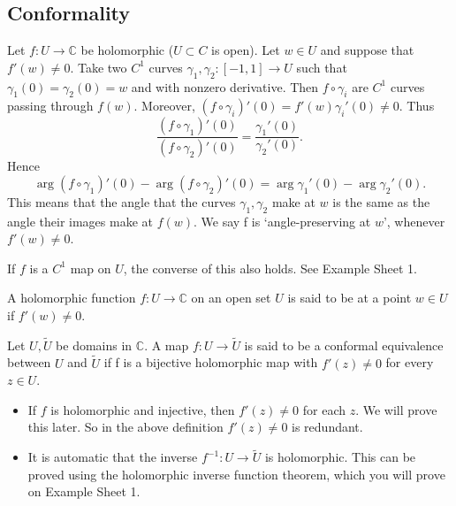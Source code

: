 \documentclass[a4paper]{scrartcl}
\begin{document}
\subsection{Conformality}
Let $f: U \rightarrow \mathbb{C}$ be holomorphic ($U \subset C $ is open). Let $w \in U$ and suppose that $f' (w) \neq 0$. Take two $C^{1}$ curves $\gamma_1 , \gamma_2 : [-1,1] \rightarrow U$ such that $\gamma_1 (0)=\gamma_2 (0)=w$ and with nonzero derivative. Then $f \circ \gamma_i$ are $C^{1}$ curves passing through $f (w)$. Moreover, $(f \circ \gamma_i)' (0)=f' (w)\gamma_{i}' (0)\neq 0$. Thus \[
\frac{(f \circ \gamma_1 )' (0)}{(f \circ \gamma_2 )' (0)}= \frac{\gamma_1 ' (0)}{\gamma_2 ' (0)}
.\]
Hence \[
\operatorname{arg}(f \circ \gamma_1 )' (0)-\operatorname{arg}(f \circ \gamma_2 )' (0)=\operatorname{arg}\gamma_1 ' (0)-\operatorname{arg}\gamma_2 ' (0)
.\] This means that the angle that the curves $\gamma_1 , \gamma_2 $ make at $w$ is the same as the angle their images make at $f (w)$. We say f is `angle-preserving at $w$', whenever $f' (w) \neq 0$.
\begin{remark}
      If $f$ is a $C^{1}$ map on $U$, the converse of this also holds. See Example Sheet 1. 
\end{remark}
\begin{definition*}
      A holomorphic function $f: U \rightarrow \mathbb{C}$ on an open set $U$ is said to be  at a point $w \in U$ if $f' (w) \neq 0$.
\end{definition*}
\begin{definition*}
      Let $U, \widetilde{U} $ be domains in $\mathbb{C}$. A map $f: U \rightarrow \widetilde{U}$ is said to be a conformal equivalence between $U$ and $\widetilde{U}$ if f is a bijective holomorphic map with $f' (z) \neq 0$ for every $z \in U$.
\end{definition*}
\begin{remark}
      \begin{itemize}
           \item If $f$ is holomorphic and injective, then $f' (z) \neq 0$ for each $z$. We will prove this later. So in the above definition $f' (z) \neq 0$ is redundant. 
           \item It is automatic that the inverse ${f}^{-1}: U \rightarrow \widetilde{U}$ is holomorphic. This can be proved using the holomorphic inverse function theorem, which you will prove on Example Sheet 1.
      \end{itemize}
\end{remark}
\end{document}
